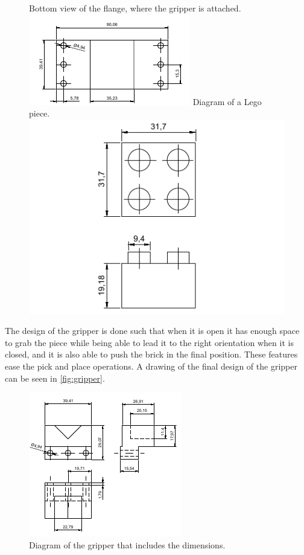 \begin{figure}[H]
    \captionbox
    {
        Bottom view of the flange, where the gripper is attached.
        \label{fig:holder}                                 
    }                                                                 
    {                                                                  
        \includegraphics[width=.4\textwidth]{figures/holder}         
    }                                                                   
    \hspace{5pt}
    \captionbox
    {
        Diagram of a Lego piece.
        \label{fig:legobrick}                                     
    }                                                                           
    {                                                                            
        \includegraphics[width=.4\textwidth]{figures/LegoPiece}            
    }                                                                            
\end{figure}
The design of the gripper is done such that when it is open it has enough space to grab the piece while being able to lead it to the right orientation when it is closed, and it is also able to push the brick in the final position. These features ease the pick and place operations. A drawing of the final design of the gripper can be seen in \autoref{fig:gripper}.

\begin{figure}[H]
    \includegraphics[width=.4\textwidth]{figures/gripper}
    \caption{Diagram of the gripper that includes the dimensions.}
    \label{fig:gripper}  
\end{figure}


